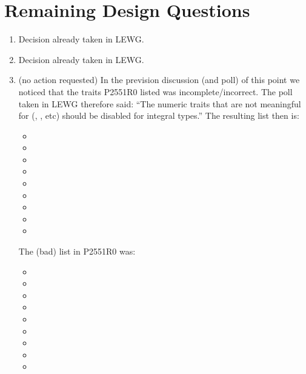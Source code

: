 \section{Remaining Design Questions}
\begin{enumerate}
  \item Decision already taken in LEWG.

  \item Decision already taken in LEWG.

  \item (no action requested) In the prevision discussion (and poll) of this point we noticed that the traits P2551R0 listed was incomplete/incorrect.
  The poll taken in LEWG therefore said: “The numeric traits that are not meaningful for  (, , etc) should be disabled for integral types.”
  The resulting list then is:
  \begin{itemize}
    \item {}
    \item {}
    \item {}
    \item {}
    \item {}
    \item {}
    \item {}
    \item {}
    \item {}
  \end{itemize}
  The (bad) list in P2551R0 was:
  \begin{itemize}
    \item {}
    \item {}
    \item {}
    \item {}
    \item {}
    \item {}
    \item {}
    \item {}
    \item {}
  \end{itemize}


\end{enumerate}
